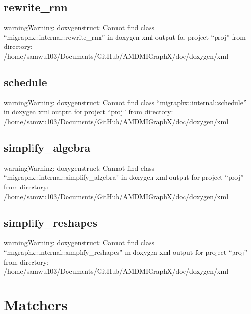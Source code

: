 \documentclass[letterpaper,10pt,english]{sphinxmanual}
\begin{document}
\subsection{rewrite\_rnn}
\label{\detokenize{dev/pass:rewrite-rnn}}
\begin{sphinxadmonition}{warning}{Warning:}
\sphinxAtStartPar
doxygenstruct: Cannot find class “migraphx::internal::rewrite\_rnn” in doxygen xml output for project “proj” from directory: /home/samwu103/Documents/GitHub/AMDMIGraphX/doc/doxygen/xml
\end{sphinxadmonition}


\subsection{schedule}
\label{\detokenize{dev/pass:schedule}}
\begin{sphinxadmonition}{warning}{Warning:}
\sphinxAtStartPar
doxygenstruct: Cannot find class “migraphx::internal::schedule” in doxygen xml output for project “proj” from directory: /home/samwu103/Documents/GitHub/AMDMIGraphX/doc/doxygen/xml
\end{sphinxadmonition}


\subsection{simplify\_algebra}
\label{\detokenize{dev/pass:simplify-algebra}}
\begin{sphinxadmonition}{warning}{Warning:}
\sphinxAtStartPar
doxygenstruct: Cannot find class “migraphx::internal::simplify\_algebra” in doxygen xml output for project “proj” from directory: /home/samwu103/Documents/GitHub/AMDMIGraphX/doc/doxygen/xml
\end{sphinxadmonition}


\subsection{simplify\_reshapes}
\label{\detokenize{dev/pass:simplify-reshapes}}
\begin{sphinxadmonition}{warning}{Warning:}
\sphinxAtStartPar
doxygenstruct: Cannot find class “migraphx::internal::simplify\_reshapes” in doxygen xml output for project “proj” from directory: /home/samwu103/Documents/GitHub/AMDMIGraphX/doc/doxygen/xml
\end{sphinxadmonition}


\section{Matchers}
\label{\detokenize{dev/matchers:matchers}}\label{\detokenize{dev/matchers::doc}}
\end{document}
